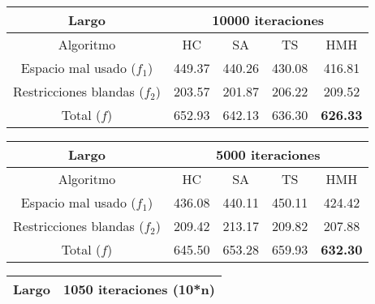 \documentclass[letter, 10pt]{article}
\begin{document}
\begin{table}[H]
    \begin{center}
    \begin{tabular}{|c|cccc|}
    \hline
    Largo                        & \multicolumn{4}{c|}{10000 iteraciones}                                                                    \\ \hline
    Algoritmo                    & \multicolumn{1}{c|}{HC}     & \multicolumn{1}{c|}{SA}     & \multicolumn{1}{c|}{TS}     & HMH             \\ \hline
    Espacio mal usado ($f_1$)     & \multicolumn{1}{c|}{449.37} & \multicolumn{1}{c|}{440.26} & \multicolumn{1}{c|}{430.08} & 416.81          \\ \hline
    Restricciones blandas ($f_2$) & \multicolumn{1}{c|}{203.57} & \multicolumn{1}{c|}{201.87} & \multicolumn{1}{c|}{206.22} & 209.52          \\ \hline
    Total ($f$)                    & \multicolumn{1}{c|}{652.93} & \multicolumn{1}{c|}{642.13} & \multicolumn{1}{c|}{636.30} & \textbf{626.33} \\ \hline
    \end{tabular}
    \begin{tabular}{|c|cccc|}
    \hline
    Largo                        & \multicolumn{4}{c|}{5000 iteraciones}                                                                    \\ \hline
    Algoritmo                    & \multicolumn{1}{c|}{HC}     & \multicolumn{1}{c|}{SA}     & \multicolumn{1}{c|}{TS}     & HMH             \\ \hline
    Espacio mal usado ($f_1$)     & \multicolumn{1}{c|}{436.08} & \multicolumn{1}{c|}{440.11} & \multicolumn{1}{c|}{450.11} & 424.42          \\ \hline
    Restricciones blandas ($f_2$) & \multicolumn{1}{c|}{209.42} & \multicolumn{1}{c|}{213.17} & \multicolumn{1}{c|}{209.82} & 207.88          \\ \hline
    Total ($f$)                    & \multicolumn{1}{c|}{645.50} & \multicolumn{1}{c|}{653.28} & \multicolumn{1}{c|}{659.93} & \textbf{632.30} \\ \hline
    \end{tabular}
    \begin{tabular}{|c|cccc|}
    \hline
    Largo                        & \multicolumn{4}{c|}{1050 iteraciones (10*n)}                                                                    \\ \hline

\end{tabular}
\end{center}
\end{table}
\end{document}
